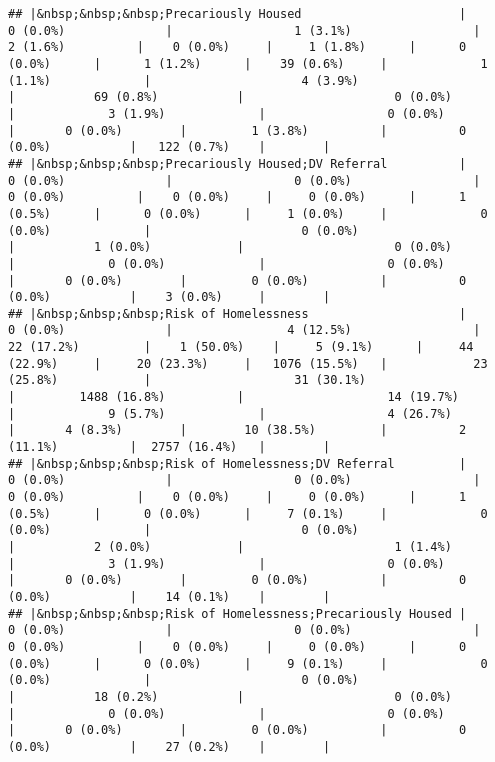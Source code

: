 \documentclass[
]{article}
\begin{document}
\begin{verbatim}
## |&nbsp;&nbsp;&nbsp;Precariously Housed                      |              0 (0.0%)              |                 1 (3.1%)                 |         2 (1.6%)          |    0 (0.0%)     |     1 (1.8%)      |      0 (0.0%)      |      1 (1.2%)      |    39 (0.6%)     |             1 (1.1%)             |                     4 (3.9%)                     |           69 (0.8%)           |                     0 (0.0%)                      |             3 (1.9%)             |                 0 (0.0%)                  |       0 (0.0%)        |         1 (3.8%)          |          0 (0.0%)           |   122 (0.7%)    |        |
## |&nbsp;&nbsp;&nbsp;Precariously Housed;DV Referral          |              0 (0.0%)              |                 0 (0.0%)                 |         0 (0.0%)          |    0 (0.0%)     |     0 (0.0%)      |      1 (0.5%)      |      0 (0.0%)      |     1 (0.0%)     |             0 (0.0%)             |                     0 (0.0%)                     |           1 (0.0%)            |                     0 (0.0%)                      |             0 (0.0%)             |                 0 (0.0%)                  |       0 (0.0%)        |         0 (0.0%)          |          0 (0.0%)           |    3 (0.0%)     |        |
## |&nbsp;&nbsp;&nbsp;Risk of Homelessness                     |              0 (0.0%)              |                4 (12.5%)                 |        22 (17.2%)         |    1 (50.0%)    |     5 (9.1%)      |     44 (22.9%)     |     20 (23.3%)     |   1076 (15.5%)   |            23 (25.8%)            |                    31 (30.1%)                    |         1488 (16.8%)          |                    14 (19.7%)                     |             9 (5.7%)             |                 4 (26.7%)                 |       4 (8.3%)        |        10 (38.5%)         |          2 (11.1%)          |  2757 (16.4%)   |        |
## |&nbsp;&nbsp;&nbsp;Risk of Homelessness;DV Referral         |              0 (0.0%)              |                 0 (0.0%)                 |         0 (0.0%)          |    0 (0.0%)     |     0 (0.0%)      |      1 (0.5%)      |      0 (0.0%)      |     7 (0.1%)     |             0 (0.0%)             |                     0 (0.0%)                     |           2 (0.0%)            |                     1 (1.4%)                      |             3 (1.9%)             |                 0 (0.0%)                  |       0 (0.0%)        |         0 (0.0%)          |          0 (0.0%)           |    14 (0.1%)    |        |
## |&nbsp;&nbsp;&nbsp;Risk of Homelessness;Precariously Housed |              0 (0.0%)              |                 0 (0.0%)                 |         0 (0.0%)          |    0 (0.0%)     |     0 (0.0%)      |      0 (0.0%)      |      0 (0.0%)      |     9 (0.1%)     |             0 (0.0%)             |                     0 (0.0%)                     |           18 (0.2%)           |                     0 (0.0%)                      |             0 (0.0%)             |                 0 (0.0%)                  |       0 (0.0%)        |         0 (0.0%)          |          0 (0.0%)           |    27 (0.2%)    |        |

\end{verbatim}
\end{document}

